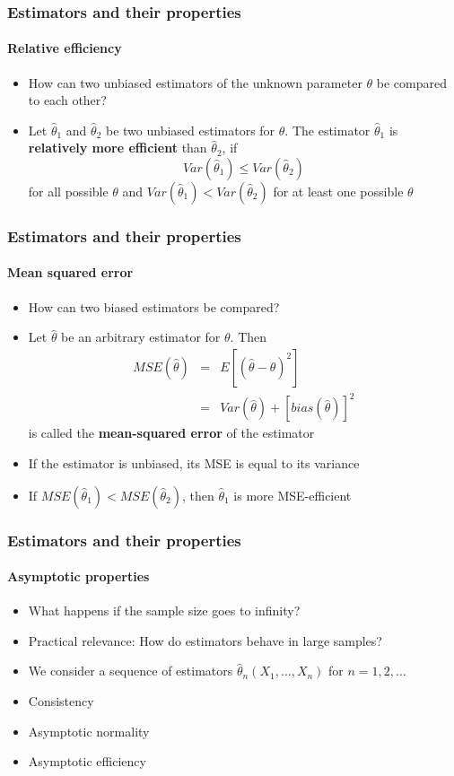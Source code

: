 \documentclass[notes=show]{beamer}
\begin{document}
\begin{frame}\frametitle{Estimators and their properties}\framesubtitle{Relative efficiency}
\begin{itemize}
    \item How can two unbiased estimators of the unknown parameter $\theta $ be compared to each other?
    \item Let $\hat{\theta}_{1}$ and $\hat{\theta}_{2}$ be two unbiased estimators for $\theta $. The estimator $\hat{\theta}_{1}$ is \textbf{relatively more efficient }than $\hat{\theta}_{2}$, if
        \begin{equation*}
            Var(\hat{\theta}_{1})\leq Var(\hat{\theta}_{2})
        \end{equation*}
        for all possible $\theta $ and $Var(\hat{\theta}_{1})<Var(\hat{\theta}_{2})$ for at least one possible $\theta $
\end{itemize}
\end{frame}


\begin{frame}\frametitle{Estimators and their properties}\framesubtitle{Mean squared error}
\begin{itemize}
    \item How can two biased estimators be compared?
    \item Let $\hat{\theta}$ be an arbitrary estimator for $\theta $. Then
        \begin{eqnarray*}
            MSE(\hat{\theta}) &=&E\left[ \left( \hat{\theta}-\theta \right) ^{2}\right]\\
            &=&Var\left( \hat{\theta}\right) +\left[ bias(\hat{\theta})\right] ^{2}
        \end{eqnarray*}
        is called the \textbf{mean-squared error} of the estimator
    \item If the estimator is unbiased, its MSE is equal to its variance
    \item If $MSE(\hat{\theta}_{1})<MSE(\hat{\theta}_{2})$, then $\hat{\theta}_{1}$ is more MSE-efficient
\end{itemize}
\end{frame}


\begin{frame}\frametitle{Estimators and their properties}\framesubtitle{Asymptotic properties}
\begin{itemize}
    \item What happens if the sample size goes to infinity?
    \item Practical relevance: How do estimators behave in large samples?
    \item We consider a sequence of estimators $\hat{\theta}_{n}(X_{1},\ldots,X_{n})$ for $n=1,2,\ldots $
    \item Consistency
    \item Asymptotic normality
    \item Asymptotic efficiency
\end{itemize}
\end{frame}
\end{document}
